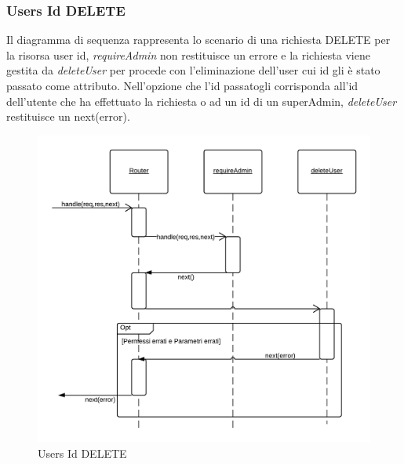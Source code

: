 \subsubsection{Users Id DELETE} 
Il diagramma di sequenza rappresenta lo scenario di una richiesta DELETE per la risorsa user id, \emph{requireAdmin} non restituisce un errore e la richiesta viene gestita da \emph{deleteUser} per procede con l'eliminazione dell'user cui id gli è stato passato come attributo.
Nell'opzione che l'id passatogli corrisponda all'id dell'utente che ha effettuato la richiesta o ad un id di un superAdmin, \emph{deleteUser} restituisce un next(error).
\begin{figure}[H]
	\begin{center} 
		\includegraphics[scale=0.20]{scenari/Users Id DELETE.png} 
		\caption{Users Id DELETE}
	\end{center} 
\end{figure}

